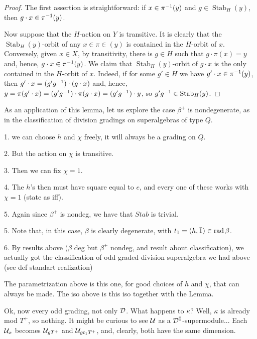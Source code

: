 \begin{proof}
    The first assertion is straightforward: if $x\in \pi^{-1}(y)$ and $g \in \operatorname{Stab}_H (y)$, then $g \cdot x \in \pi^{-1}(y)$. 
    
    Now suppose that the $H$-action on $Y$ is transitive. 
    It is clearly that the $\operatorname{Stab}_H (y)$-orbit of any $x\in \pi\in(y)$ is contained in the $H$-orbit of $x$. Conversely, given $x\in X$, by transitivity, there is $g\in H$ such that $g \cdot \pi(x) = y$ and, hence, $g\cdot x \in \pi^{-1} (y)$. 
    We claim that $\operatorname{Stab}_H (y)$-orbit of $g\cdot x$ is the only contained in the $H$-orbit of $x$. 
    Indeed, if for some $g'\in H$ we have $g'\cdot x \in \pi^{-1}(y)$, then $g'\cdot x = (g'g^{-1})\cdot (g\cdot x)$ and, hence, $y = \pi(g'\cdot x) = (g'g^{-1})\cdot \pi(g\cdot x) = (g'g^{-1}) \cdot y$, so $g'g^{-1} \in \operatorname{Stab}_H (y)$.
\end{proof}

As an application of this lemma, let us explore the case $\beta^+$ is nondegenerate, as in the classification of division gradings on superalgebras of type $Q$.

1. we can choose $h$ and $\chi$ freely, it will always be a grading on $Q$. 

2. But the action on $\chi$ is transitive. 

3. Then we can fix $\chi = 1$.

4. The $h$'s then must have square equal to $e$, and every one of these works with $\chi = 1$ (state as iff).

5. Again since $\beta^+$ is nondeg, we have that $Stab$ is trivial.

5. Note that, in this case, $\beta$ is clearly degenerate, with $t_1 = (h, \bar 1) \in \operatorname{rad} \beta$. 

6. By results above ($\beta$ deg but $\beta^+$ nondeg, and result about classification), we actually got the classification of odd graded-division superalgebra we had above (see def standart realization)

The parametrization above is this one, for good choices of $h$ and $\chi$, that can always be made.
The iso above is this iso together with the Lemma.


Ok, now every odd grading, not only $\mathcal{D}$.
What happens to $\kappa$? Well, $\kappa$ is already mod $T^+$, so nothing. 
It might be curious to see $\mathcal U$ as a $\mathcal{D}^{\bar0}$-supermodule...
Each $\mathcal U_x$ becomes $\mathcal U_{gT^+}$ and $\mathcal U_{gt_1 T^+}$, and, clearly, both have the same dimension.


